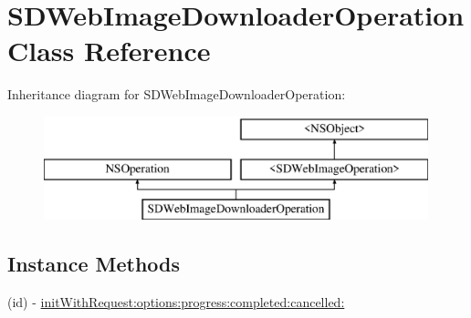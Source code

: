 \hypertarget{interface_s_d_web_image_downloader_operation}{}\section{S\+D\+Web\+Image\+Downloader\+Operation Class Reference}
\label{interface_s_d_web_image_downloader_operation}
Inheritance diagram for S\+D\+Web\+Image\+Downloader\+Operation\+:\begin{figure}[H]
\begin{center}
\leavevmode
\includegraphics[height=3.000000cm]{interface_s_d_web_image_downloader_operation}
\end{center}
\end{figure}
\subsection*{Instance Methods}
\begin{DoxyCompactItemize}
\item 
(id) -\/ \hyperlink{interface_s_d_web_image_downloader_operation_af684c0887b1476b75355ff48c173daa2}{init\+With\+Request\+:options\+:progress\+:completed\+:cancelled\+:}
\end{DoxyCompactItemize}
